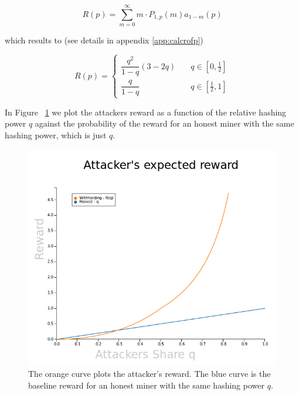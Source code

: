 \documentclass[letterpaper,12pt]{report}
\theoremstyle{plain}
\theoremstyle{definition}
\begin{document}
\begin{equation}\label{eq:rofpdef}
\mathit{R}(p)=\sum_{m=0}^{\infty}m\cdot\mathit{P}_{1,p}(m)\mathit{a}_{1-m}(p)
\end{equation}

which results to (see details in appendix \ref{app:calcrofp})

\begin{equation}\label{eq:rofp}
\mathit{R}(p)=
\begin{cases}
\dfrac{q^2}{1-q}\left(
3-2q
\right) & \quad q \in [0,\frac{1}{2}] \\
\dfrac{q}{1-q} & \quad q \in [\frac{1}{2},1] 
\end{cases}
\end{equation}


In Figure ~\ref{fig:AttackersReward} we plot the attackers reward as a function of the relative hashing power $q$ against the probability of the reward for an honest miner with the same hashing power, which is just $q$.

\begin{figure}[reward]
\centering
\includegraphics[width=150mm]{AttackersReward.png}
\caption{The orange curve plots the attacker's reward. The blue curve is the baseline reward for an honest miner with the same hashing power $q$.}
\label{fig:AttackersReward}
\end{figure}
\end{document}
